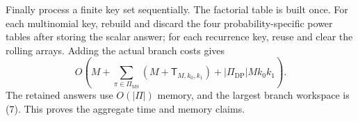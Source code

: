 Finally process a finite key set sequentially.  The factorial table is built once.  For each multinomial key, rebuild and discard the four probability-specific power tables after storing the scalar answer; for each recurrence key, reuse and clear the rolling arrays.  Adding the actual branch costs gives
\[
O\!\left(M+\sum_{\pi\in\Pi_{\mathrm{MS}}}(M+\mathsf T_{M,k_0,k_1})+|\Pi_{\mathrm{DP}}|Mk_0k_1\right). \tag{8}
\]
The retained answers use \(O(|\Pi|)\) memory, and the largest branch workspace is (7).  This proves the aggregate time and memory claims.